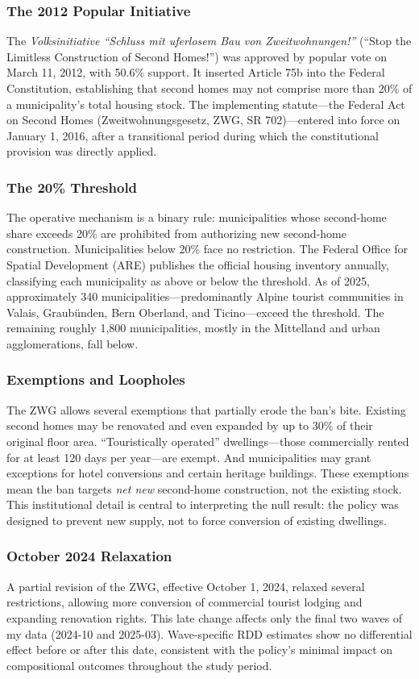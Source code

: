 \documentclass[12pt]{article}
\begin{document}
\subsubsection*{The 2012 Popular Initiative} The \textit{Volksinitiative ``Schluss mit uferlosem Bau von Zweitwohnungen!''} (``Stop the Limitless Construction of Second Homes!'') was approved by popular vote on March 11, 2012, with 50.6\% support. It inserted Article 75b into the Federal Constitution, establishing that second homes may not comprise more than 20\% of a municipality's total housing stock. The implementing statute---the Federal Act on Second Homes (Zweitwohnungsgesetz, ZWG, SR 702)---entered into force on January 1, 2016, after a transitional period during which the constitutional provision was directly applied.

\subsubsection*{The 20\% Threshold} The operative mechanism is a binary rule: municipalities whose second-home share exceeds 20\% are prohibited from authorizing new second-home construction. Municipalities below 20\% face no restriction. The Federal Office for Spatial Development (ARE) publishes the official housing inventory annually, classifying each municipality as above or below the threshold. As of 2025, approximately 340 municipalities---predominantly Alpine tourist communities in Valais, Graub{\"u}nden, Bern Oberland, and Ticino---exceed the threshold. The remaining roughly 1,800 municipalities, mostly in the Mittelland and urban agglomerations, fall below.

\subsubsection*{Exemptions and Loopholes} The ZWG allows several exemptions that partially erode the ban's bite. Existing second homes may be renovated and even expanded by up to 30\% of their original floor area. ``Touristically operated'' dwellings---those commercially rented for at least 120 days per year---are exempt. And municipalities may grant exceptions for hotel conversions and certain heritage buildings. These exemptions mean the ban targets \textit{net new} second-home construction, not the existing stock. This institutional detail is central to interpreting the null result: the policy was designed to prevent new supply, not to force conversion of existing dwellings.

\subsubsection*{October 2024 Relaxation} A partial revision of the ZWG, effective October 1, 2024, relaxed several restrictions, allowing more conversion of commercial tourist lodging and expanding renovation rights. This late change affects only the final two waves of my data (2024-10 and 2025-03). Wave-specific RDD estimates show no differential effect before or after this date, consistent with the policy's minimal impact on compositional outcomes throughout the study period.
\end{document}

